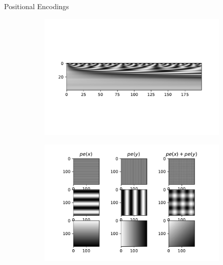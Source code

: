 \documentclass[aspectratio=169]{beamer}
\begin{document}
\begin{frame}{Positional Encodings}
    \begin{figure}
        \begin{subfigure}{0.4\textwidth}
            \includegraphics[width=\textwidth]{../windgraph/1dposenc}
        \end{subfigure}
        \begin{subfigure}{0.5\textwidth}
            \includegraphics[width=\textwidth]{../windgraph/posenc}
        \end{subfigure}
    \end{figure}
\end{frame}
\end{document}
